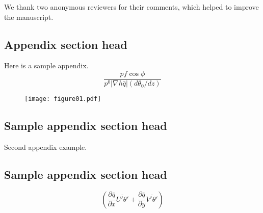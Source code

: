 \documentclass[twocol]{ametsocV5}
\begin{document}

\acknowledgments
We thank two anonymous reviewers for their comments, which helped
to improve the manuscript.

\appendix
{}

\subsection*{Appendix section head}

Here is a sample appendix.
\begin{equation}
\frac{
pf \cos\phi}
{p^0|\nabla h\bar q|(d\theta_0/dz)}
\end{equation}


\begin{figure}
 \centerline{\texttt{[image: figure01.pdf]}}
\end{figure}


\appendix[B]
\subsection{Sample appendix section head}
Second appendix example.
\subsection{Sample appendix section head}
\begin{equation}
\left(\frac{\partial\bar q}{\partial x}
\overline{U'\theta'} +
\frac{\partial\bar q}{\partial y}
\overline{V'\theta'}\right) 
\end{equation}











\end{document}
